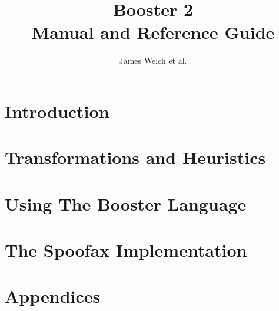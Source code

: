 \documentclass[12pt]{ociamthesis}  %
\title{Booster 2\\[1ex]Manual and Reference Guide}   %
\author{James Welch et al.}             %
\begin{document}

\setcounter{secnumdepth}{3}
\setcounter{tocdepth}{3}


\maketitle                  %

\begin{romanpages}          %
\tableofcontents            %
\listoffigures              %
\end{romanpages}            %

\part{Introduction}




\part{Transformations and Heuristics}

\part{Using The Booster Language}

\part{The Spoofax Implementation}



%

\appendix

\part{Appendices}




\end{document}
